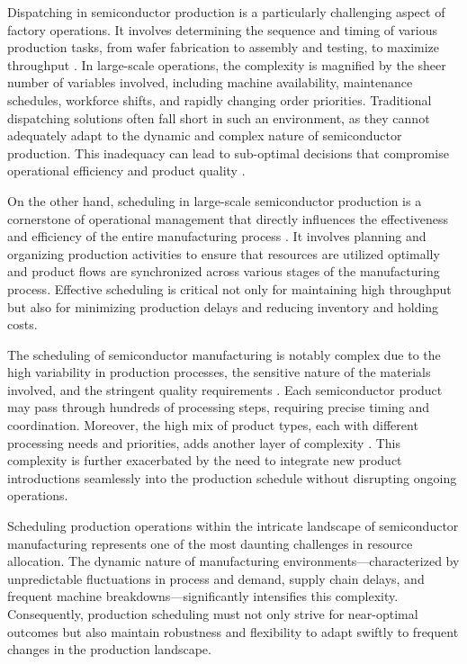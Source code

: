 \documentclass[runningheads]{llncs}
\begin{document}
Dispatching in semiconductor production is a particularly challenging aspect of factory operations. It involves determining the sequence and timing of various production tasks, from wafer fabrication to assembly and testing, to maximize throughput \cite{Hopp2011}. In large-scale operations, the complexity is magnified by the sheer number of variables involved, including machine availability, maintenance schedules, workforce shifts, and rapidly changing order priorities. Traditional dispatching solutions often fall short in such an environment, as they cannot adequately adapt to the dynamic and complex nature of semiconductor production. This inadequacy can lead to sub-optimal decisions that compromise operational efficiency and product quality \cite{Uzsoy1992}.

On the other hand, scheduling in large-scale semiconductor production is a cornerstone of operational management that directly influences the effectiveness and efficiency of the entire manufacturing process \cite{schumann2022scheduling}. It involves planning and organizing production activities to ensure that resources are utilized optimally and product flows are synchronized across various stages of the manufacturing process. Effective scheduling is critical not only for maintaining high throughput but also for minimizing production delays and reducing inventory and holding costs.

The scheduling of semiconductor manufacturing is notably complex due to the high variability in production processes, the sensitive nature of the materials involved, and the stringent quality requirements \cite{May2006}. Each semiconductor product may pass through hundreds of processing steps, requiring precise timing and coordination. Moreover, the high mix of product types, each with different processing needs and priorities, adds another layer of complexity \cite{Mönch2011}. This complexity is further exacerbated by the need to integrate new product introductions seamlessly into the production schedule without disrupting ongoing operations.

Scheduling production operations within the intricate landscape of semiconductor manufacturing represents one of the most daunting challenges in resource allocation. The dynamic nature of manufacturing environments—characterized by unpredictable fluctuations in process and demand, supply chain delays, and frequent machine breakdowns—significantly intensifies this complexity. Consequently, production scheduling must not only strive for near-optimal outcomes but also maintain robustness and flexibility to adapt swiftly to frequent changes in the production landscape.     
\end{document}
